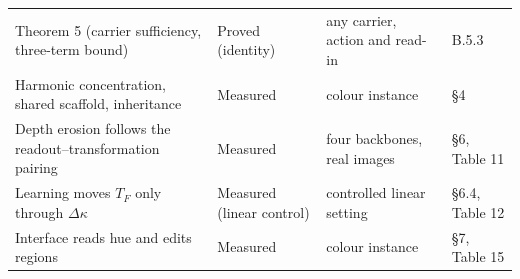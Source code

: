\begin{table}[t]
\begin{tabularx}{\textwidth}{@{}>{\raggedright\arraybackslash}X >{\raggedright\arraybackslash}X >{\raggedright\arraybackslash}X >{\raggedright\arraybackslash}X@{}}
Theorem 5 (carrier sufficiency, three-term bound) & Proved (identity) & any carrier, action and read-in & B.5.3 \\
Harmonic concentration, shared scaffold, inheritance & Measured & colour instance & \S{}4 \\
Depth erosion follows the readout--transformation pairing & Measured & four backbones, real images & \S{}6, Table 11 \\
Learning moves $T_F$ only through $\Delta\kappa$ & Measured (linear control) & controlled linear setting & \S{}6.4, Table 12 \\
Interface reads hue and edits regions & Measured & colour instance & \S{}7, Table 15 \\
\bottomrule
\end{tabularx}
\end{table}

